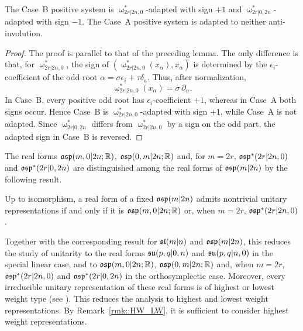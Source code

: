 \begin{lemma}\label{lemm::adapted_systems_osp_star}
The Case~B positive system is
$\upomega^{*}_{2r\vert2n,0}$-adapted with sign $+1$ and
$\upomega^{*}_{2r\vert0,2n}$-adapted with sign $-1$.
The Case~A positive system is adapted to neither anti-involution.
\end{lemma}
\begin{proof}
The proof is parallel to that of the preceding lemma. The only difference is
that, for $\upomega^{*}_{2r\vert2n,0}$, the sign of
$(\upomega^{*}_{2r\vert2n,0}(x_\alpha),x_\alpha)$ is determined by the
$\epsilon_i$-coefficient of the odd root
$\alpha=\sigma\epsilon_i+\tau\delta_a$. Thus, after normalization,
\[
\upomega^{*}_{2r\vert2n,0}(x_\alpha)
=
\sigma\,\partial_\alpha.
\]
In Case~B, every positive odd root has $\epsilon_i$-coefficient $+1$, whereas
in Case~A both signs occur. Hence Case~B is
$\upomega^{*}_{2r\vert2n,0}$-adapted with sign $+1$, while Case~A is not
adapted. Since $\upomega^{*}_{2r\vert0,2n}$ differs from
$\upomega^{*}_{2r\vert2n,0}$ by a sign on the odd part, the adapted sign in
Case~B is reversed.
\end{proof}

The real forms $\osp(m,0\vert 2n;\RR)$, $\osp(0,m\vert 2n;\RR)$ and, for
$m=2r$, $\osp^{\ast}(2r\vert 2n,0)$ and $\osp^{\ast}(2r\vert 0,2n)$ are distinguished among the real forms of
$\osp(m\vert 2n)$ by the following result.

\begin{theorem}
Up to isomorphism, a real form of a fixed $\osp(m\vert 2n)$ admits nontrivial unitary
representations if and only if it is $\osp(m,0\vert 2n;\RR)$ or, when
$m=2r$, $\osp^{\ast}(2r\vert 2n,0)$.
\end{theorem}

Together with the corresponding result for $\sl(m\vert n)$ and $\osp(m\vert 2n)$, this reduces the study of unitarity to the real forms $\su(p,q\vert0,n)$ and $\su(p,q\vert n,0)$ in the special linear case, and to $\osp(m,0\vert 2n;\RR)$, $\osp(0,m\vert 2n;\RR)$ and, when $m=2r$, $\osp^{\ast}(2r\vert 2n,0)$ and $\osp^{\ast}(2r\vert 0,2n)$ in the orthosymplectic case. Moreover, every irreducible unitary representation of these real forms is of highest or lowest weight type (see \cite[Section~7]{neeb2011lie}). This reduces the analysis to highest and lowest weight representations. By Remark~\ref{rmk::HW_LW}, it is sufficient to consider highest weight representations.

